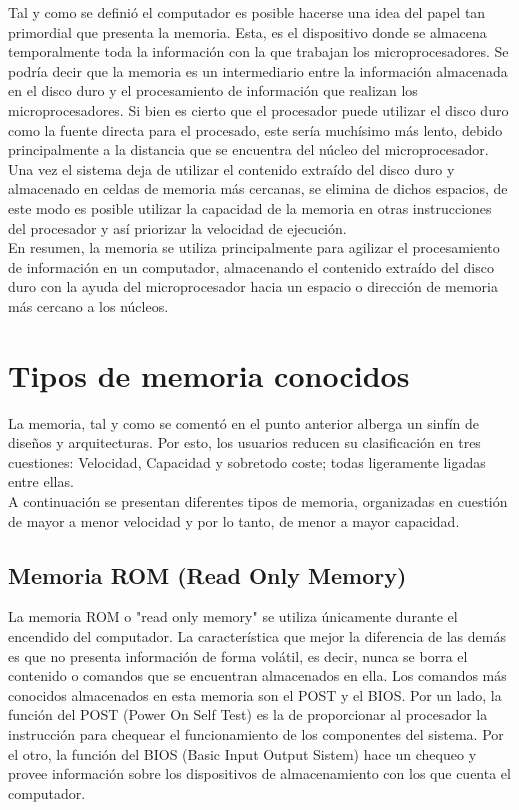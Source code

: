 \documentclass{article}
\begin{document}
\noindent
Tal y como se definió el computador es posible hacerse una idea del papel tan primordial que presenta la memoria. Esta, es el dispositivo donde se almacena temporalmente toda la información con la que trabajan los microprocesadores. Se podría decir que la memoria es un intermediario entre la información almacenada en el disco duro y el procesamiento de información que realizan los microprocesadores. Si bien es cierto que el procesador puede utilizar el disco duro como la fuente directa para el procesado, este sería muchísimo más lento, debido principalmente a la distancia que se encuentra del núcleo del microprocesador.
Una vez el sistema deja de utilizar el contenido extraído del disco duro y almacenado en celdas de memoria más cercanas, se elimina de dichos espacios, de este modo es posible utilizar la capacidad de la memoria en otras instrucciones del procesador y así priorizar la velocidad de ejecución.\\
\noindent
En resumen, la memoria se utiliza principalmente para agilizar el procesamiento de información en un computador, almacenando el contenido extraído del disco duro con la ayuda del microprocesador hacia un espacio o dirección de memoria más cercano a los núcleos.


\section{Tipos de memoria conocidos} \label{contenido}
\noindent
La memoria, tal y como se comentó en el punto anterior alberga un sinfín de diseños y arquitecturas. Por esto, los usuarios reducen su clasificación en tres cuestiones: Velocidad, Capacidad y sobretodo coste; todas ligeramente ligadas entre ellas.\\
\noindent
A continuación se presentan diferentes tipos de memoria, organizadas en cuestión de mayor a menor velocidad y por lo tanto, de menor a mayor capacidad.

\subsection{Memoria ROM (Read Only Memory)}
\noindent
La memoria ROM o "read only memory" se utiliza únicamente durante el encendido del computador. La característica que mejor la diferencia de las demás es que no presenta información de forma volátil, es decir, nunca se borra el contenido o comandos que se encuentran almacenados en ella. Los comandos más conocidos almacenados en esta memoria son el POST y el BIOS.
Por un lado, la función del POST (Power On Self Test) es la de proporcionar al procesador la instrucción para chequear el funcionamiento de los componentes del sistema.
Por el otro, la función del BIOS (Basic Input Output Sistem) hace un chequeo y provee información sobre los dispositivos de almacenamiento con los que cuenta el computador.
\end{document}
